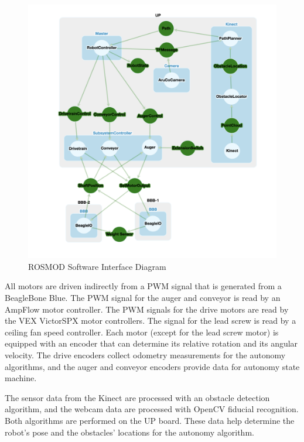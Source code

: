 \documentclass[class=article, crop=false]{standalone}
\begin{document}
	\FloatBarrier
	\begin{figure}
		\centering
		\includegraphics[width=1\linewidth]{09_Figures/programming_interfaces.png}
		\caption{ROSMOD Software Interface Diagram}
		\label{fig:system_hierarchy}
	\end{figure}
	\FloatBarrier
	
	All motors are driven indirectly from a PWM signal that is generated from a BeagleBone Blue. The PWM signal for the auger and conveyor is read by an AmpFlow motor controller. The PWM signals for the drive motors are read by the VEX VictorSPX motor controllers. The signal for the lead screw is read by a ceiling fan speed controller. Each motor (except for the lead screw motor) is equipped with an encoder that can determine its relative rotation and its angular velocity. The drive encoders collect odometry measurements for the autonomy algorithms, and the auger and conveyor encoders provide data for autonomy state machine. 
	
	The sensor data from the Kinect are processed with an obstacle detection algorithm, and the webcam data are processed with OpenCV fiducial recognition. Both algorithms are performed on the UP board. These data help determine the robot’s pose and the obstacles’ locations for the autonomy algorithm. 
	
\end{document}
